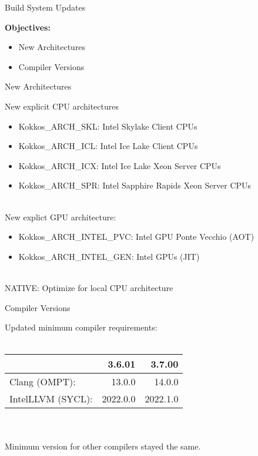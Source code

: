 

\begin{frame}[fragile]

  {\Huge Build System Updates}

  \vspace{10pt}

    \vspace{20pt}

  \textbf{Objectives:}
  \begin{itemize}
    \item New Architectures
    \item Compiler Versions
  \end{itemize}

  \vspace{-20pt}

\end{frame}


\begin{frame}[fragile]{New Architectures}

New explicit CPU architectures
  \begin{itemize}
   \item Kokkos\_ARCH\_SKL: Intel Skylake Client CPUs
   \item Kokkos\_ARCH\_ICL: Intel Ice Lake Client CPUs
   \item Kokkos\_ARCH\_ICX: Intel Ice Lake Xeon Server CPUs
   \item Kokkos\_ARCH\_SPR: Intel Sapphire Rapids Xeon Server CPUs
  \end{itemize}
~\\
  New explict GPU architecture:
  \begin{itemize}
    \item Kokkos\_ARCH\_INTEL\_PVC: Intel GPU Ponte Vecchio (AOT)
    \item Kokkos\_ARCH\_INTEL\_GEN: Intel GPUs (JIT)
  \end{itemize}
~\\
  NATIVE: Optimize for local CPU architecture

\end{frame}

\begin{frame}[fragile]{Compiler Versions}

Updated minimum compiler requirements:\\
~\\
 \begin{tabular}{l|r|r}
      & 3.6.01 & 3.7.00 \\
      \hline
   Clang (OMPT): & 13.0.0  & 14.0.0 \\
   IntelLLVM (SYCL):    & 2022.0.0 & 2022.1.0\\
  \end{tabular}\\
  ~\\
 Minimum version for other compilers stayed the same.

\end{frame}
